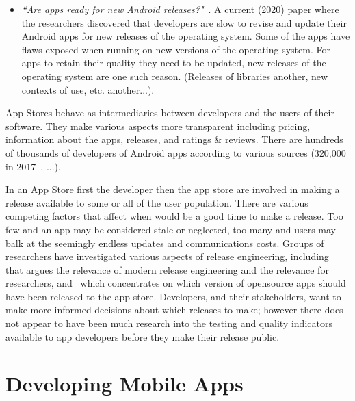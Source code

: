 \begin{itemize}
    \item \emph{``Are apps ready for new Android releases?"}~\cite{guilardi_are_apps_ready_for_new_android_releases}. A current (2020) paper where the researchers discovered that developers are slow to revise and update their Android apps for new releases of the operating system. Some of the apps have flaws exposed when running on new versions of the operating system. For apps to retain their quality they need to be updated, new releases of the operating system are one such reason. (Releases of libraries another, new contexts of use, etc. another...).
    
\end{itemize}


App Stores behave as intermediaries between developers and the users of their software. They make various aspects more transparent including pricing, information about the apps, releases, and ratings \& reviews. There are hundreds of thousands of developers of Android apps according to various sources (320,000 in 2017~\cite{wang2017_exploratory_study_of_the_mobile_app_ecosystem}, ...).


In an App Store first the developer then the app store are involved in making a release available to some or all of the user population. There are various competing factors that affect when would be a good time to make a release. Too few and an app may be considered stale or neglected, too many and users may balk at the seemingly endless updates and communications costs. Groups of researchers have investigated various aspects of release engineering, including~\cite{adams2016modern} that argues the relevance of modern release engineering and the relevance for researchers, and~\cite{nayebi2017version} which concentrates on which version of opensource apps should have been released to the app store. Developers, and their stakeholders, want to make more informed decisions about which releases to make; however there does not appear to have been much research into the testing and quality indicators available to app developers before they make their release public.


\section{Developing Mobile Apps}

